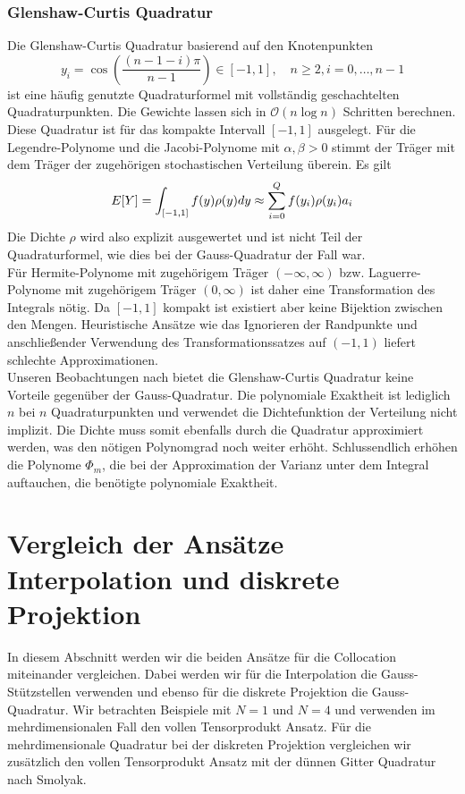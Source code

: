 \subsubsection*{Glenshaw-Curtis Quadratur}
Die Glenshaw-Curtis Quadratur basierend auf den Knotenpunkten 
\[y_i=\cos\left(\frac{(n-1-i)\pi}{n-1}\right)\in[-1,1],\quad n\ge 2, i=0,\dots,n-1\]
ist eine häufig genutzte Quadraturformel mit vollständig geschachtelten Quadraturpunkten. Die Gewichte lassen sich in $\mathcal{O}(n\log n)$ Schritten berechnen.\\
Diese Quadratur ist für das kompakte Intervall $[-1,1]$ ausgelegt. Für die Legendre-Polynome und die Jacobi-Polynome mit $\alpha,\beta>0$ stimmt der Träger mit dem Träger der zugehörigen stochastischen Verteilung überein. Es gilt
\[\\E[Y]=\int_{[-1,1]}f(y)\rho(y)dy\approx\sum_{i=0}^Qf(y_i)\rho(y_i)a_i\]
Die Dichte $\rho$ wird also explizit ausgewertet und ist nicht Teil der Quadraturformel, wie dies bei der Gauss-Quadratur der Fall war.\\
Für Hermite-Polynome mit zugehörigem Träger $(-\infty,\infty)$ bzw. Laguerre-Polynome mit zugehörigem Träger $(0,\infty)$ ist daher eine Transformation des Integrals nötig. Da $[-1,1]$ kompakt ist existiert aber keine Bijektion zwischen den Mengen. Heuristische Ansätze wie das Ignorieren der Randpunkte und anschließender Verwendung des Transformationssatzes auf $(-1,1)$ liefert schlechte Approximationen.\\
Unseren Beobachtungen nach bietet die Glenshaw-Curtis Quadratur keine Vorteile gegenüber der Gauss-Quadratur. Die polynomiale Exaktheit ist lediglich $n$ bei $n$ Quadraturpunkten und verwendet die Dichtefunktion der Verteilung nicht implizit. Die Dichte muss somit ebenfalls durch die Quadratur approximiert werden, was den nötigen Polynomgrad noch weiter erhöht. Schlussendlich erhöhen die Polynome $\Phi_m$, die bei der Approximation der Varianz unter dem Integral auftauchen, die benötigte polynomiale Exaktheit.

\section{Vergleich der Ansätze Interpolation und diskrete Projektion}
In diesem Abschnitt werden wir die beiden Ansätze für die Collocation miteinander vergleichen. Dabei werden wir für die Interpolation die Gauss-Stützstellen verwenden und ebenso für die diskrete Projektion die Gauss-Quadratur. Wir betrachten Beispiele mit $N=1$ und $N=4$ und verwenden im mehrdimensionalen Fall den vollen Tensorprodukt Ansatz. Für die mehrdimensionale Quadratur bei der diskreten Projektion vergleichen wir zusätzlich den vollen Tensorprodukt Ansatz mit der dünnen Gitter Quadratur nach Smolyak.
